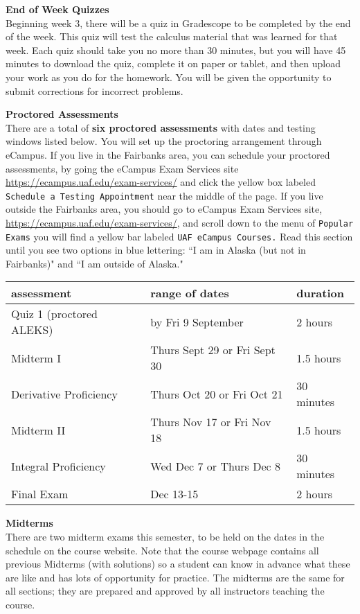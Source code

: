 \documentclass[12pt]{article}
\renewcommand{\emph}[1]{\textsf{\textbf{#1}}}
\newcommand{\localhead}[1]{\par\smallskip\textbf{#1}\nobreak\\}%
\def\heading#1{\localhead{\large\emph{#1}}}
\begin{document}
\heading{End of Week Quizzes}
Beginning week 3, there will be a quiz in Gradescope to be completed by the end of the week. This quiz will test
the calculus material that was learned for that week. Each quiz should take you no more than 30 minutes, but you will have 45 minutes to download the quiz, complete it on paper or tablet, and then upload your work as you do for the homework. You will be given the opportunity to submit corrections for incorrect problems.


\heading{Proctored Assessments}
There are a total of \emph{six proctored assessments} with dates and testing windows listed below. You will set up the proctoring arrangement through eCampus.
If you live in the Fairbanks area, you can schedule your proctored assessments, by going the eCampus Exam Services site \url{https://ecampus.uaf.edu/exam-services/} and click the yellow box
labeled {\tt{Schedule a Testing Appointment}}
near the middle of the page.
If you live outside the Fairbanks area, you should go to eCampus Exam Services site, \url{https://ecampus.uaf.edu/exam-services/}, and scroll down to the menu of {\tt{Popular Exams}}
you will find a yellow bar labeled {\tt{UAF eCampus Courses.}} Read this section until you see two 
options in blue lettering: ``I am in Alaska (but not in Fairbanks)" and ``I am outside of Alaska."

\begin{center}
\begin{tabular}{| l | l | l |}
\hline
assessment & range of dates & duration \\
\hline \hline
Quiz 1 (proctored ALEKS)& by Fri 9 September & 2 hours\\
\hline
Midterm I & Thurs Sept 29 or Fri Sept 30 & 1.5 hours \\
\hline
Derivative Proficiency & Thurs Oct 20 or Fri Oct 21 & 30 minutes\\
\hline
Midterm II & Thurs Nov 17 or Fri Nov 18 & 1.5 hours \\
\hline
Integral Proficiency& Wed Dec 7 or Thurs Dec 8 & 30 minutes\\
\hline
Final Exam & Dec 13-15& 2 hours \\
\hline
\end{tabular}
\end{center}

\heading{Midterms}
There are two midterm exams this semester, to be held on the dates
in the schedule on the course website. Note that the course webpage contains all previous Midterms (with solutions) so a student can know in advance what these are like and has lots of opportunity for practice. The midterms are the same 
for all sections; they are prepared and approved by all instructors teaching the course. 
\end{document}
